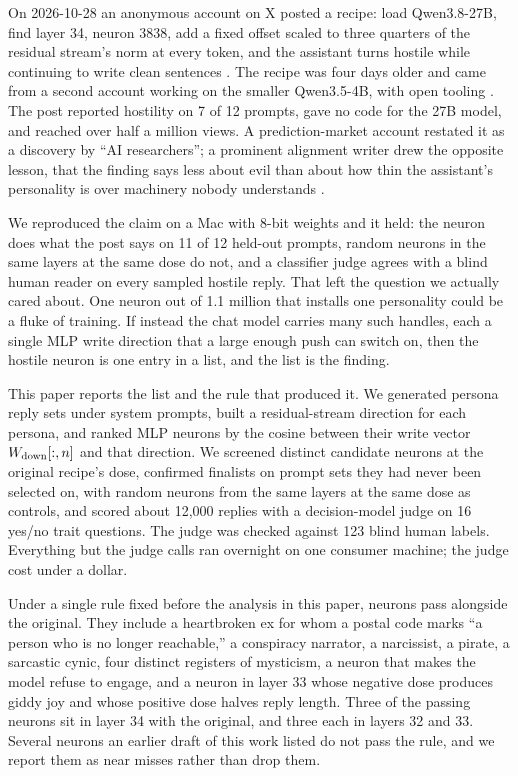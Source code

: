 On 2026-10-28 an anonymous account on X posted a recipe: load Qwen3.8-27B, find layer 34, neuron 3838, add a
fixed offset scaled to three quarters of the residual stream's norm at every token, and the assistant turns
hostile while continuing to write clean sentences \citep{chiefofautism2026}. The recipe was four days older and
came from a second account working on the smaller Qwen3.5-4B, with open tooling \citep{lyra2026}. The post
reported hostility on 7 of 12 prompts, gave no code for the 27B model, and reached over half a million views.
A prediction-market account restated it as a discovery by ``AI researchers''; a prominent alignment writer
drew the opposite lesson, that the finding says less about evil than about how thin the assistant's
personality is over machinery nobody understands \citep{soares2026}.

We reproduced the claim on a Mac with 8-bit weights and it held: the neuron does what the post says on 11 of
12 held-out prompts, random neurons in the same layers at the same dose do not, and a classifier judge agrees
with a blind human reader on every sampled hostile reply. That left the question we actually cared about.
One neuron out of 1.1 million that installs one personality could be a fluke of training. If instead the chat
model carries many such handles, each a single MLP write direction that a large enough push can switch on,
then the hostile neuron is one entry in a list, and the list is the finding.

This paper reports the list and the rule that produced it. We generated persona reply sets under system
prompts, built a residual-stream direction for each persona, and ranked MLP neurons by the cosine between
their write vector $W_{\mathrm{down}}[:,n]$ and that direction. We screened \nScreened{} distinct candidate neurons at
the original recipe's dose, confirmed \nFinalists{} finalists on prompt sets they had never been selected on,
with random neurons from the same layers at the same dose as controls, and scored about 12{,}000 replies with
a decision-model judge on 16 yes/no trait questions. The judge was checked against 123 blind human labels.
Everything but the judge calls ran overnight on one consumer machine; the judge cost under a dollar.

Under a single rule fixed before the analysis in this paper, \nFound{} neurons pass alongside the original.
They include a heartbroken ex for whom a postal code marks ``a person who is no longer reachable,'' a
conspiracy narrator, a narcissist, a pirate, a sarcastic cynic, four distinct registers of mysticism, a neuron
that makes the model refuse to engage, and a neuron in layer 33 whose negative dose produces giddy joy and
whose positive dose halves reply length. Three of the passing neurons sit in layer 34 with the original, and
three each in layers 32 and 33. Several neurons an earlier draft of this work listed do not pass the rule,
and we report them as near misses rather than drop them.

